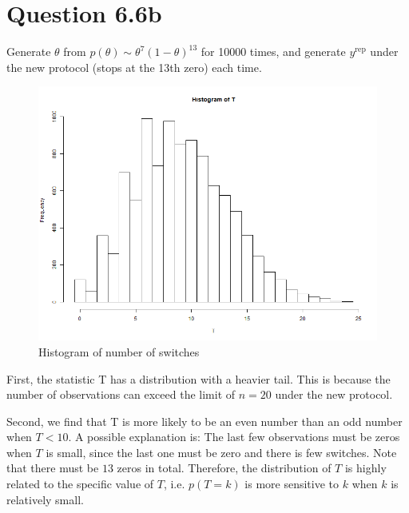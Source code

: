 \documentclass{article}
\begin{document}
\section*{Question 6.6b}
{
    Generate $\theta$ from $p(\theta) \sim \theta^{7} (1-\theta)^{13}$ for 10000 times, and generate $y^\mathrm{rep}$ under the new protocol (stops at the 13th zero) each time. 
    \begin{figure}[H]
        \centering
        \includegraphics[width = 1.0\linewidth]{switches.histogram.png}
        \caption{Histogram of number of switches}
    \end{figure}

    First, the statistic T has a distribution with a heavier tail. This is because the number of observations can exceed the limit of $n=20$ under the new protocol. 

    Second, we find that T is more likely to be an even number than an odd number when $T < 10$. A possible explanation is: The last few observations must be zeros when $T$ is small, since the last one must be zero and there is few switches. Note that there must be $13$ zeros in total. Therefore, the distribution of $T$ is highly related to the specific value of $T$, i.e. $p(T=k)$ is more sensitive to $k$ when $k$ is relatively small. 
}
\end{document}
